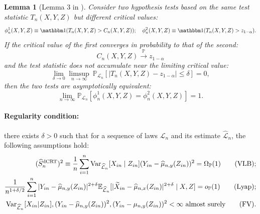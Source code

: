 \documentclass[12pt]{article}
\newtheorem{lemma}{Lemma}
\theoremstyle{definition}
\def\P{\mathbb{P}}
\def\P{\mathbb{P}}
\newcommand{\E}{\mathbb E}								%
\newcommand{\V}{\mathrm{Var}}							%
\renewcommand{\P}{\mathbb{P}}							%
\newcommand{\indicator}{\mathbbm 1}						%
\newcommand{\convp}{\overset{\mathbb{P}}{\rightarrow}}             %
\newcommand{\srx}{X}									%
\newcommand{\srz}{Z}									%
\newcommand{\srxk}{\widetilde X}						%
\newcommand{\sry}{Y}									%
\newcommand{\law}{\mathcal L}							%
\newcommand{\lawhat}{\widehat{\mathcal L}}				%
\newcommand{\dCRT}{\textnormal{dCRT}} 					%
\begin{document}
\begin{lemma}[Lemma 3 in \cite{Niu2022a}]\label{lem:unified_asymptotic_equivalence}
	Consider two hypothesis tests based on the same test statistic $T_n(\srx, \sry, \srz)$ but different critical values:
	\begin{equation*}
		\phi_n^1(\srx, \sry, \srz) \equiv \indicator(T_n(\srx, \sry, \srz) > C_n(\srx, \sry, \srz)); \quad \phi_n^2(\srx, \sry, \srz) \equiv \indicator(T_n(\srx, \sry, \srz) > z_{1-\alpha}). 
	\end{equation*}
	If the critical value of the first converges in probability to that of the second:
	\begin{equation*}
		C_n(\srx, \sry, \srz) \convp z_{1-\alpha}
	\end{equation*}
	and the test statistic does not accumulate near the limiting critical value:
	\begin{equation}
		\lim_{\delta \rightarrow 0}\limsup_{n \rightarrow \infty}\ \P_{\law_n}[|T_n(\srx, \sry, \srz)-z_{1-\alpha}| \leq \delta] = 0,
		\label{eq:non-accumulation-app}
	\end{equation}
	then the two tests are asymptotically equivalent:
	\begin{equation*}
		\lim_{n \rightarrow \infty}\P_{\law_n}[\phi_n^{1}(\srx, \sry, \srz) = \phi_n^2(\srx, \sry, \srz)] = 1.
	\end{equation*}
\end{lemma}


\paragraph{\textbf{Regularity condition:}}
there exists $\delta>0$ such that for a sequence of laws $\law_n$ and its estimate $\lawhat_n$, the following assumptions hold:
\begin{align}
    (\widehat{S}_n^{\dCRT})^2\equiv\frac{1}{n}\sum_{i=1}^n\V_{\lawhat_n}[\srx_{in}\mid \srz_{in}](\sry_{in}-\widehat{\mu}_{n,y}(\srz_{in}))^2=\Omega_\P(1) \label{eq:variance_lower_bound} \tag{VLB};\\
    \frac{1}{n^{1+\delta/2}} \sum_{i=1}^n |\sry_{in}-\widehat \mu_{n,y}(\srz_{in})|^{2+\delta}\E_{\lawhat_n}[|\srxk_{in}-\widehat\mu_{n,x}(\srz_{in})|^{2+\delta}\mid \srx,\srz] =o_\P(1)\label{eq:Lyapunov_condition_2} \tag{Lyap};\\
    \V_{\lawhat_n}[\srx_{in}|\srz_{in}],(\sry_{in}-\widehat{\mu}_{n,y}(\srz_{in}))^2,(\sry_{in}-\mu_{n,y}(\srz_{in}))^2<\infty\ \text{almost surely}\label{eq:non_degeneracy} \tag{FV}.
\end{align}
\end{document}
